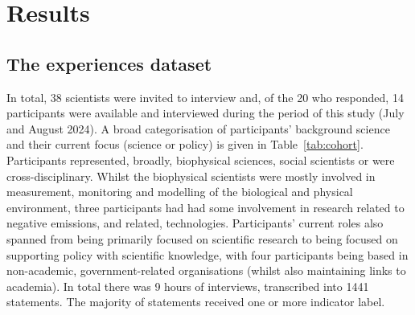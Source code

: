 \chapter{Results}\label{ch:results}

\section{The experiences dataset}\label{sec:resdataset}
In total, 38 scientists were invited to interview and, of the 20 who responded, 14 participants were available and interviewed during the period of this study (July and August 2024). A broad categorisation of participants' background science and their current focus (science or policy) is given in Table~\ref{tab:cohort}. Participants represented, broadly, biophysical sciences, social scientists or were cross-disciplinary. Whilst the biophysical scientists were mostly involved in measurement, monitoring and modelling of the biological and physical environment, three participants had had some involvement in research related to negative emissions, and related, technologies. Participants' current roles also spanned from being primarily focused on scientific research to being focused on supporting policy with scientific knowledge, with four participants being based in non-academic, government-related organisations (whilst also maintaining links to academia). In total there was 9\textonehalf{} hours of interviews, transcribed into 1441 statements. The majority of statements received one or more indicator label.


